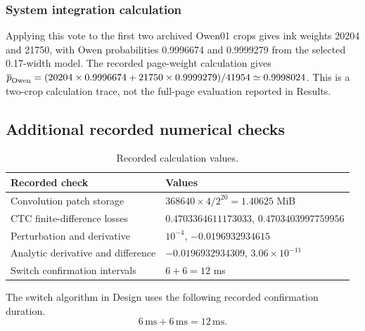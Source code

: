 \subsubsection{System integration calculation}
Applying this vote to the first two archived Owen01 crops gives ink weights 20204 and 21750, with Owen probabilities 0.9996674 and 0.9999279 from the selected 0.17-width model. The recorded page-weight calculation gives $\overline p_{\rm Owen}=(20204\times0.9996674+21750\times0.9999279)/41954\simeq0.9998024$. This is a two-crop calculation trace, not the full-page evaluation reported in Results.
\subsection{Additional recorded numerical checks}\label{app:des-expanded-checks}\label{app:des-real-calculations}
\begin{table}[H]\centering\small
\begin{tabular}{p{.43\linewidth}p{.49\linewidth}}
\toprule Recorded check & Values\\\midrule
Convolution patch storage & $368640\times4/2^{20}=1.40625$ MiB\\
CTC finite-difference losses & $0.4703364611173033$, $0.4703403997759956$\\
Perturbation and derivative & $10^{-4}$, $-0.0196932934615$\\
Analytic derivative and difference & $-0.0196932934309$, $3.06\times10^{-11}$\\
Switch confirmation intervals & $6+6=12$ ms\\
\bottomrule\end{tabular}
\caption{Recorded calculation values.}\label{tab:app-numeric-values}\end{table}
The switch algorithm in Design uses the following recorded confirmation duration.
\begin{equation}6\,\mathrm{ms}+6\,\mathrm{ms}=12\,\mathrm{ms}.\label{eq:gan-latency}\end{equation}
